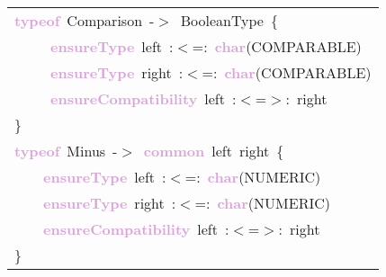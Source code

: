 \begin{tabular}[t]{l}
\noindent
\mbox{}\textbf{\textcolor{Plum}{typeof}}\ Comparison\ -$>$\ BooleanType\ \{ \\
\mbox{}\ \ \ \ \ \textbf{\textcolor{Plum}{ensureType}}\ left\ :$<$=:\ \textbf{\textcolor{Plum}{char}}(COMPARABLE) \\
\mbox{}\ \ \ \ \ \textbf{\textcolor{Plum}{ensureType}}\ right\ :$<$=:\ \textbf{\textcolor{Plum}{char}}(COMPARABLE) \\
\mbox{}\ \ \ \ \ \textbf{\textcolor{Plum}{ensureCompatibility}}\ left\ :$<$=$>$:\ right \\
\mbox{}\} \\
\mbox{}\textbf{\textcolor{Plum}{typeof}}\ Minus\ -$>$\ \textbf{\textcolor{Plum}{common}}\ left\ right\ \{ \\
\mbox{}\ \ \ \ \textbf{\textcolor{Plum}{ensureType}}\ left\ :$<$=:\ \textbf{\textcolor{Plum}{char}}(NUMERIC) \\
\mbox{}\ \ \ \ \textbf{\textcolor{Plum}{ensureType}}\ right\ :$<$=:\ \textbf{\textcolor{Plum}{char}}(NUMERIC) \\
\mbox{}\ \ \ \ \textbf{\textcolor{Plum}{ensureCompatibility}}\ left\ :$<$=$>$:\ right \\
\mbox{}\}
\end{tabular}
